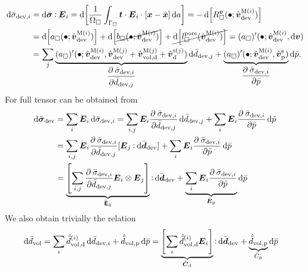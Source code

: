 \documentclass[10pt,a4paper]{article}
\newcommand{\pore}{\mathrm{pore}}
\newcommand{\ded}{\mathrm{d}}
\newcommand{\dep}{\mathrm{p}}
\begin{document}
\begin{align}
    \dif\bar{\sigma}_{\dev,i}
    & = 
    \dif\bar{\ts\sigma}\dprod \ts E_i 
    =
    \dif\left[\frac{1}{\Omega_\Box} \int_{\Gamma_\Box} \ts t \cdot \ts E_i \cdot [\ta x - \bar{\ta x}]\dif a\right]
    =
    -\dif\left[R_\Box^{\ts v}(\bullet;\hat{\ts v}_\dev^{\macro(i)})\right]
\nonumber\\
    &=
    \dif\left[a_\Box(\bullet; \hat{\ta{v}}^{\macro(i)}_\dev)\right] + \dif\left[\cancel{b_\Box(\bullet; \hat{\ta{v}}^{\macro(i)}_\dev)}\right] + \cancel{\dif\left[l_\Box^\pore(\hat{\ta{v}}^{\macro(i)}_\dev)\right]} = (a_\Box)'(\bullet; \hat{\ta{v}}^{\macro(i)}_\dev,\dif\ta{v})
    \nonumber \\
    & = 
    \sum_{j}
    \underbrace{(a_\Box)'(\bullet;\hat{\ta{v}}^{\macro(i)}_\dev,\hat{\ta{v}}^{\macro(j)}_\dev +
    \hat{\ta{v}}^{\macro(j)}_{\vol,\ded} +
    \hat{\ta{v}}^{\fluct(j)}_\ded)}_{\displaystyle \pd{\bar{\sigma}_{\dev,i}}{\bar{d}_{\dev,j}}}
    \dif\bar{d}_{\dev,j}
    + \underbrace{(a_\Box)'(\bullet;\hat{\ta{v}}^{\macro(i)}_\dev, \hat{\ta{v}}^{\fluct}_\dep)}_{\displaystyle \pd{\bar{\sigma}_{\dev,i} }{ \bar{p} } }
    \dif\bar{p}.
    \label{eq219}
\end{align}
For full tensor can be obtained from
\begin{align}
 \dif\bar{\ts\sigma}_\dev 
	&= \sum_i \ts E_i \dif\bar{\sigma}_{\dev,i}
	= \sum_{i,j} \ts E_i \pd{\bar{\sigma}_{\dev,i}}{\bar{d}_{\dev,j}} \dif\bar{d}_{\dev,j} + \sum_i \ts E_i \pd{\bar{\sigma}_{\dev,i}}{\bar{p}}\dif\bar{p}
\nonumber\\
	&= \sum_{i,j} \ts E_i \pd{\bar{\sigma}_{\dev,i}}{\bar{d}_{\dev,j}} [\ts E_j \dprod \dif\bar{\ts d}_{\dev}] + \sum_i \ts E_i \pd{\bar{\sigma}_{\dev,i}}{\bar{p}}\dif\bar{p}
\nonumber\\
    &= \underbrace{\left[\sum_{i,j} \pd{\bar{\sigma}_{\dev,i}}{\bar{d}_{\dev,j}} \ts E_i \outerp \ts E_j\right]}_{\bar{\tf E}_\ded} \dprod \dif\bar{\ts d}_{\dev}
	  + \underbrace{\sum_i \ts E_i \pd{\bar{\sigma}_{\dev,i}}{\bar{p}}}_{\bar{\ts E}_\dep}\dif\bar{p}
\end{align}
We also obtain trivially the relation
\begin{align}
    \dif\bar{d}_\vol
    & = \sum_{i}\hat{\bar{d}}^{(i)}_{\vol,\ded}\dif\bar{d}_{\dev,i} + \hat{\bar{d}}_{\vol,\dep}\dif\bar{p}
      = \underbrace{\left[\sum_{i}\hat{\bar{d}}^{(i)}_{\vol,\ded} \ts E_i\right]}_{\bar{\ts C}_\ded} \dprod\dif\bar{\ts d}_{\dev} + \underbrace{\hat{\bar{d}}_{\vol,\dep}}_{\bar{C}_\dep}\dif\bar{p}
    \label{eq220}
\end{align}
\end{document}
